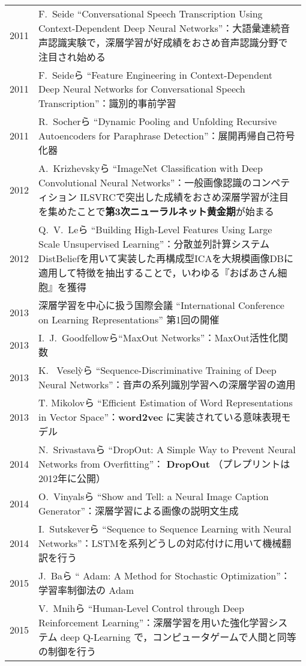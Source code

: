\documentclass[12pt,a4paper,oneside]{jsarticle}
\begin{document}
{\begin{longtable}{@{\hspace{0.005\linewidth}}p{0.075\linewidth}@{\hspace{0.005\linewidth}}p{0.91\linewidth}@{\hspace{0.005\linewidth}}}
2011 & F.~Seide ``Conversational Speech Transcription Using Context-Dependent Deep Neural Networks''：大語彙連続音声認識実験で，深層学習が好成績をおさめ音声認識分野で注目され始める \\
2011 & F.~Seideら ``Feature Engineering in Context-Dependent Deep Neural Networks for Conversational Speech Transcription''：識別的事前学習 \\
2011 & R.~Socherら ``Dynamic Pooling and Unfolding Recursive Autoencoders for Paraphrase Detection''：展開再帰自己符号化器 \\
2012 & A.~Krizhevskyら ``ImageNet Classification with Deep Convolutional Neural Networks''：一般画像認識のコンペティション ILSVRCで突出した成績をおさめ深層学習が注目を集めたことで\textbf{第3次ニューラルネット黄金期}が始まる \\
2012 & Q.~V.~Leら ``Building High-Level Features Using Large Scale Unsupervised Learning''：分散並列計算システムDistBeliefを用いて実装した再構成型ICAを大規模画像DBに適用して特徴を抽出することで，いわゆる『おばあさん細胞』を獲得 \\
2013 & 深層学習を中心に扱う国際会議 ``International Conference on Learning Representations'' 第1回の開催 \\
2013 & I.~J.~Goodfellowら``MaxOut Networks''：MaxOut活性化関数 \\
2013 & K.~ Vesel\`yら ``Sequence-Discriminative Training of Deep Neural Networks''：音声の系列識別学習への深層学習の適用 \\
2013 & T. Mikolovら ``Efficient Estimation of Word Representations in Vector Space''：\textbf{word2vec} に実装されている意味表現モデル \\
2014 & N.~Srivastavaら ``DropOut: A Simple Way to Prevent Neural Networks from Overfitting''： \textbf{DropOut} （プレプリントは2012年に公開）\\
2014 & O.~Vinyalsら ``Show and Tell: a Neural Image Caption Generator''：深層学習による画像の説明文生成 \\
2014 & I.~Sutskeverら ``Sequence to Sequence Learning with Neural Networks''：LSTMを系列どうしの対応付けに用いて機械翻訳を行う \\
2015 & J.~Baら ``	Adam: A Method for Stochastic Optimization''：学習率制御法の Adam \\
2015 & V.~Mnihら ``Human-Level Control through Deep Reinforcement Learning''：深層学習を用いた強化学習システム deep Q-Learning で，コンピュータゲームで人間と同等の制御を行う \\
\end{longtable}%
\renewcommand{\arraystretch}{1}}
\end{document}
